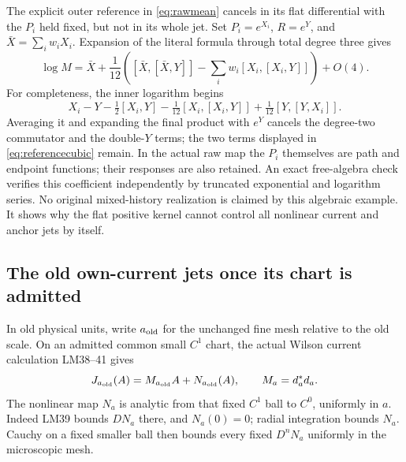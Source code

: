 \documentclass[11pt,letterpaper]{article}
\theoremstyle{plain}
\theoremstyle{remark}\newtheorem{remark}[theorem]{Scope}
\begin{document}
The explicit outer reference in \eqref{eq:rawmean} cancels in its flat
differential with the $P_i$ held fixed, but not in its whole jet. Set
$P_i=e^{X_i}$, $R=e^Y$, and
$\bar X=\sum_iw_iX_i$. Expansion of the literal formula through total
degree three gives
\begin{equation}
 \log M=\bar X+\frac1{12}
 \left([\bar X,[\bar X,Y]]
           -\sum_iw_i[X_i,[X_i,Y]]\right)+O(4).
 \label{eq:referencecubic}
\end{equation}
For completeness, the inner logarithm begins
\[
 X_i-Y-\tfrac12[X_i,Y]-\tfrac1{12}[X_i,[X_i,Y]]
       +\tfrac1{12}[Y,[Y,X_i]].
\]
Averaging it and expanding the final product with $e^Y$ cancels the
degree-two commutator and the double-$Y$ terms; the two terms displayed
in \eqref{eq:referencecubic} remain. In the actual raw map the $P_i$ themselves
are path and endpoint functions; their responses are also retained.
An exact free-algebra check verifies this coefficient independently by truncated
exponential and logarithm series. No original mixed-history realization is
claimed by this algebraic example. It shows why the flat positive kernel
cannot control all nonlinear current and anchor jets by itself.

\subsection{The old own-current jets once its chart is admitted}

In old physical units, write $a_{\rm old}$ for the unchanged fine mesh
relative to the old scale. On an admitted common small $C^1$ chart, the
actual Wilson current calculation LM38--41 gives
\begin{equation}
 J_{a_{\rm old}}(A)=M_{a_{\rm old}}A+N_{a_{\rm old}}(A),
 \qquad M_a=d_a^*d_a.
\end{equation}
The nonlinear map $N_a$ is analytic from that fixed $C^1$ ball to $C^0$,
uniformly in $a$. Indeed LM39 bounds $DN_a$ there, and $N_a(0)=0$;
radial integration bounds $N_a$. Cauchy on a fixed smaller ball then
bounds every fixed $D^nN_a$ uniformly in the microscopic mesh.
\end{document}
